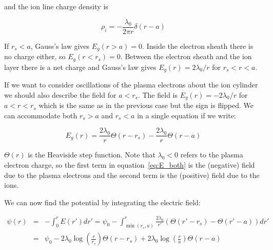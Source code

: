 \documentclass[aps,prl,preprint,groupedaddress]{revtex4-1}
\begin{document}
and the ion line charge density is 

\begin{equation}\label{eq:rho_ion}
\rho_i = -\frac{\lambda_0}{2 \pi r}\delta(r - a)
\end{equation}

If $r_s < a$, Gauss's law gives $E_g(r > a) = 0$. Inside the electron sheath there is no charge either, so $E_g(r < r_s) = 0$. Between the electron sheath and the ion layer there is a net charge and Gauss's law gives $E_g(r) = 2\lambda_0/r$ for $r_s < r < a$. 

If we want to consider oscillations of the plasma electrons about the ion cylinder we should also describe the field for $a <  r_s$. The field is $E_g(r) = -2\lambda_0/r$ for $a < r < r_s$  which is the same as in the previous case but the sign is flipped. We can accommodate both $r_s > a$ and $r_s < a$ in a single equation if we write:

\begin{equation}\label{eq:E_both}
E_g(r) = \frac{2\lambda_0}{r}\Theta(r-r_s) - \frac{2\lambda_0}{r}\Theta(r-a)
\end{equation}

$\Theta(r)$ is the Heaviside step function. Note that $\lambda_0 < 0$ refers to the plasma electron charge, so the first term in equation~\ref{eq:E_both} is the (negative) field due to the plasma electrons and the second term is the (positive) field due to the ions.

We can now find the potential by integrating the electric field:

\begin{equation}\label{eq:Psi_both}
\begin{array}{rcl}
\psi(r) & = & -\int_0^r E(r') dr' = \psi_0 - \int_{\min(r_s,a)}^r \frac{2\lambda_0}{r'}\left(\Theta(r'-r_s) - \Theta(r'-a)\right) dr' \\
& = & \psi_0 - 2\lambda_0\log\left(\frac{r}{r_s}\right)\Theta(r-r_s) + 2\lambda_0\log\left(\frac{r}{a}\right)\Theta(r-a)
\end{array}
\end{equation}
\end{document}
